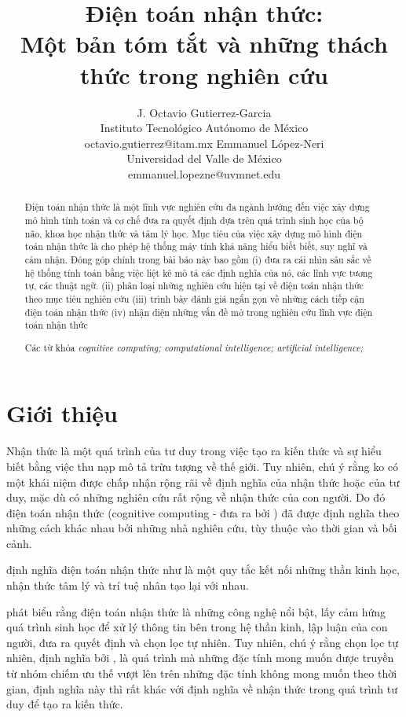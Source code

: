 \documentclass{article}
\title{Điện toán nhận thức: \\
Một bản tóm tắt và những thách thức trong nghiên cứu}
\author{
J. Octavio Gutierrez-Garcia\\
Instituto Tecnológico Autónomo de México \\
octavio.gutierrez@itam.mx
\And 
Emmanuel López-Neri \\
Universidad del Valle de México \\
emmanuel.lopezne@uvmnet.edu
}
\begin{document}
\maketitle

\begin{abstract}

Điện toán nhận thức là một lĩnh vực nghiên cứu đa ngành hướng đến việc xây dựng mô hình tính toán và cơ chế đưa ra quyết định dựa trên quá trình sinh học của bộ não, khoa học nhận thức và tâm lý học.
Mục tiêu của việc xây dựng mô hình điện toán nhận thức là cho phép hệ thống máy tính khả năng hiểu biết biết, suy nghĩ và cảm nhận.
Đóng góp chính trong bài báo này bao gồm
(i) đưa ra cái nhìn sâu sắc về hệ thống tính toán bằng việc liệt kê mô tả các định nghĩa của nó, các lĩnh vực tương tự, các thuật ngữ.
(ii) phân loại những nghiên cứu hiện tại về điện toán nhận thức theo mục tiêu nghiên cứu
(iii) trình bày đánh giá ngắn gọn về những cách tiếp cận điện toán nhận thức
(iv) nhận diện những vấn đề mở trong nghiên cứu lĩnh vực điện toán nhận thức

Các từ khóa \textit{cognitive computing; computational intelligence; artificial intelligence;}

\end{abstract}

\section{Giới thiệu} \label{sec:1-introduction}
Nhận thức là một quá trình của tư duy trong việc tạo ra kiến thức \citet{vaughn2012feeling} và sự hiểu biết bằng việc thu nạp mô tả trừu tượng về thế giới.
Tuy nhiên, chú ý rằng ko có một khái niệm được chấp nhận rộng rãi về định nghĩa của nhận thức hoặc của tư duy, mặc dù có những nghiên cứu rất rộng về nhận thức của con người.
Do đó điện toán nhận thức (cognitive computing - đưa ra bởi \citet{valiant1995cognitive} ) đã được định nghĩa theo những cách khác nhau bởi những nhà nghiên cứu, tùy thuộc vào thời gian và bối cảnh.

 định nghĩa điện toán nhận thức như là một quy tắc kết nối những thần kinh học, nhận thức tâm lý và trí tuệ nhân tạo lại với nhau.

 phát biểu rằng điện toán nhận thức là những công nghệ nổi bật, lấy cảm hứng quá trình sinh học để xử lý thông tin bên trong hệ thần kinh, lập luận của con người, đưa ra quyết định và chọn lọc tự nhiên. Tuy nhiên, chú ý rằng chọn lọc tự nhiên, định nghĩa bởi , là quá trình mà những đặc tính mong muốn được truyền từ nhóm chiếm ưu thế vượt lên trên những đặc tính không mong muốn theo thời gian, định nghĩa này thì rất khác với định nghĩa về nhận thức trong quá trình tư duy để tạo ra kiến thức.
\end{document}
